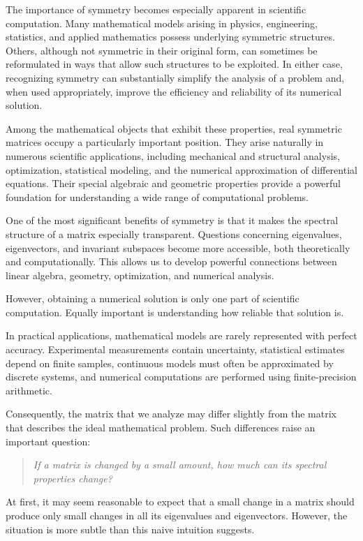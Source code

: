 \documentclass[14pt,letterpaper]{article}
\theoremstyle{plain}
\theoremstyle{definition}
\theoremstyle{remark}
\begin{document}
The importance of symmetry becomes especially apparent
in scientific computation. Many mathematical models
arising in physics, engineering, statistics, and applied
mathematics possess underlying symmetric structures.
Others, although not symmetric in their original form,
can sometimes be reformulated in ways that allow
such structures to be exploited. In either case,
recognizing symmetry can substantially simplify the
analysis of a problem and, when used appropriately,
improve the efficiency and reliability of its
numerical solution.

Among the mathematical objects that exhibit these properties, real symmetric matrices occupy a
particularly important position. They arise naturally
in numerous scientific applications, including
mechanical and structural analysis, optimization,
statistical modeling, and the numerical approximation
of differential equations. Their special algebraic
and geometric properties provide a powerful foundation
for understanding a wide range of computational
problems.

One of the most significant benefits of symmetry
is that it makes the spectral structure of a matrix
especially transparent. Questions concerning
eigenvalues, eigenvectors, and invariant subspaces
become more accessible, both theoretically and
computationally. This allows us to develop powerful
connections between linear algebra, geometry,
optimization, and numerical analysis.

However, obtaining a numerical solution is only
one part of scientific computation. Equally important
is understanding how reliable that solution is.

In practical applications, mathematical models
are rarely represented with perfect accuracy.
Experimental measurements contain uncertainty,
statistical estimates depend on finite samples,
continuous models must often be approximated by
discrete systems, and numerical computations are
performed using finite-precision arithmetic.

Consequently, the matrix that we analyze may differ
slightly from the matrix that describes the ideal
mathematical problem. Such differences raise an
important question:

\begin{quote}
\emph{
If a matrix is changed by a small amount,
how much can its spectral properties change?
}
\end{quote}

At first, it may seem reasonable to expect that
a small change in a matrix should produce only
small changes in all its eigenvalues and
eigenvectors. However, the situation is more
subtle than this naive intuition suggests.
\end{document}

